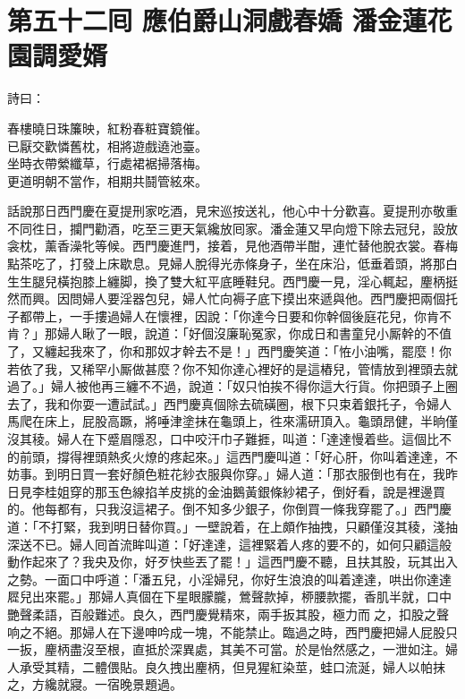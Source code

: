 
\chapter*{第五十二囘 應伯爵山洞戲春嬌 潘金蓮花園調愛婿}


詩曰：

\begin{myquote} 
春樓曉日珠簾映，紅粉春粧寶鏡催。\\已厭交歡憐舊枕，相將遊戲遶池臺。\\坐時衣帶縈纖草，行處裙裾掃落梅。\\更道明朝不當作，相期共鬪管絃來。
\end{myquote} 

話說那日西門慶在夏提刑家吃酒，見宋巡按送礼，他心中十分歡喜。夏提刑亦敬重不同徃日，{}攔門勸酒，吃至三更天氣纔放囘家。潘金蓮又早向燈下除去冠兒，設放衾枕，薰香澡牝等候。西門慶進門，接着，見他酒帶半酣，連忙替他脫衣裳。春梅點茶吃了，打發上床歇息。見婦人脫得光赤條身子，坐在床沿，低垂着頭，將那白生生腿兒橫抱膝上纏脚，{}換了雙大紅平底睡鞋兒。西門慶一見，淫心輒起，麈柄挺然而興。因問婦人要淫器包兒，婦人忙向褥子底下摸出來遞與他。西門慶把兩個托子都帶上，一手摟過婦人在懷裡，因說：「你達今日要和你幹個後庭花兒，你肯不肯？」那婦人瞅了一眼，說道：「好個沒廉恥冤家，你成日和書童兒小厮幹的不值了，又纏起我來了，你和那奴才幹去不是！」西門慶笑道：「恠小油嘴，罷麼！你若依了我，又稀罕小厮做甚麼？你不知你達心裡好的是這樁兒，管情放到裡頭去就過了。」{}婦人被他再三纏不不過，說道：「奴只怕挨不得你這大行貨。你把頭子上圈去了，我和你耍一遭試試。」西門慶真個除去硫磺圈，根下只束着銀托子，令婦人馬爬在床上，屁股高蹶，將唾津塗抹在龜頭上，徃來濡研頂入。龜頭昂健，半晌僅沒其稜。婦人在下蹙眉隱忍，口中咬汗巾子難捱，叫道：「達達慢着些。這個比不的前頭，撐得裡頭熱炙火燎的疼起來。」這西門慶叫道：「好心肝，你叫着達達，不妨事。到明日買一套好顏色粧花紗衣服與你穿。」婦人道：「那衣服倒也有在，我昨日見李桂姐穿的那玉色線掐羊皮挑的金油鵝黃銀條紗裙子，倒好看，說是裡邊買的。他每都有，只我沒這裙子。倒不知多少銀子，你倒買一條我穿罷了。」西門慶道：「不打緊，我到明日替你買。」一壁說着，在上頗作抽拽，只顧僅沒其稜，淺抽深送不已。婦人囘首流眸叫道：「好達達，這裡緊着人疼的要不的，如何只顧這般動作起來了？我央及你，好歹快些丟了罷！」這西門慶不聽，且扶其股，玩其出入之勢。一面口中呼道：「潘五兒，小淫婦兒，你好生浪浪的叫着達達，哄出你達達㞞兒出來罷。」那婦人真個在下星眼朦朧，鶯聲款掉，桺腰款擺，香肌半就，口中艷聲柔語，百般難述。良久，西門慶覺精來，兩手扳其股，極力而𢵞之，扣股之聲响之不絕。那婦人在下邊呻吟成一塊，不能禁止。臨過之時，西門慶把婦人屁股只一扳，麈柄盡沒至根，直抵於深異處，其美不可當。於是怡然感之，一泄如注。婦人承受其精，二體偎貼。良久拽出麈柄，但見猩紅染莖，蛙口流涎，婦人以帕抹之，方纔就寢。一宿晚景題過。

